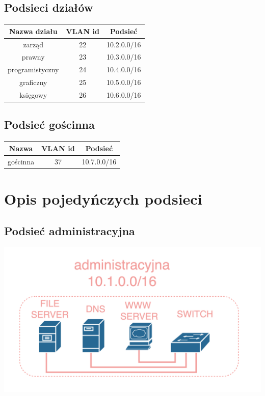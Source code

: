 \documentclass{article}
\begin{document}
    \subsection{Podsieci działów}
      \begin{tabular}{|c|c|c|}
        Nazwa działu& VLAN id & Podsieć \\
        \hline
        \textcolor{kolorZarzad}{zarząd} & \textcolor{kolorZarzad}{22} & \textcolor{kolorZarzad}{10.2.0.0/16} \\
        \hline
        \textcolor{kolorPrawny}{prawny} & \textcolor{kolorPrawny}{23} & \textcolor{kolorPrawny}{10.3.0.0/16} \\
        \hline
        \textcolor{kolorProgramistyczny}{programistyczny} & \textcolor{kolorProgramistyczny}{24} & \textcolor{kolorProgramistyczny}{10.4.0.0/16} \\
        \hline
        \textcolor{kolorGraficzny}{graficzny} & \textcolor{kolorGraficzny}{25} & \textcolor{kolorGraficzny}{10.5.0.0/16} \\
        \hline
        \textcolor{kolorKsiegowy}{księgowy} & \textcolor{kolorKsiegowy}{26} & \textcolor{kolorKsiegowy}{10.6.0.0/16} \\
      \end{tabular}

    \subsection{Podsieć gościnna}
      \begin{tabular}{|c|c|c|}
        Nazwa & VLAN id & Podsieć \\
        \hline
        \textcolor{kolorGoscinna}{gościnna} & \textcolor{kolorGoscinna}{37} & \textcolor{kolorGoscinna}{10.7.0.0/16} \\
      \end{tabular}

  \section{Opis pojedyńczych podsieci}
    \subsection{Podsieć administracyjna}
      \centerline{\includegraphics[width=\textwidth,keepaspectratio]{podsiec-administracyjna}}
\end{document}

